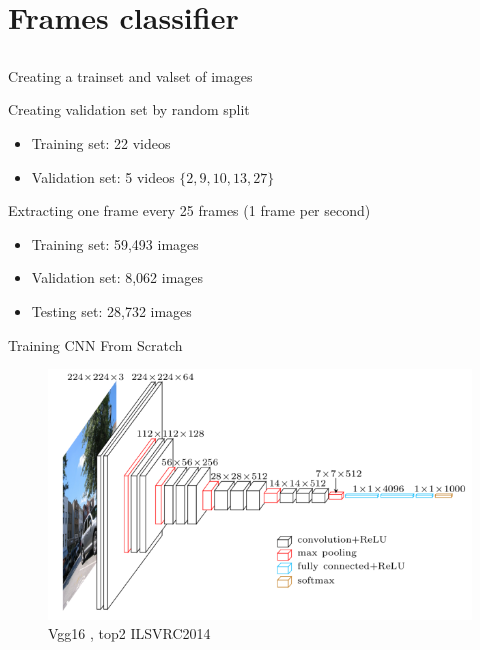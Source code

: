 \section{Frames classifier} \subsection{}\label{}

\begin{frame}{Creating a trainset and valset of images}

	\begin{block}{Creating validation set by random split}
	\begin{itemize}
		\item Training set: 22 videos
		\item Validation set: 5 videos $\{2,9,10,13,27\}$
	\end{itemize}
	\end{block}	
	
	\begin{block}{Extracting one frame every 25 frames (1 frame per second)}
	\begin{itemize}
		\item Training set: 59,493 images
		\item Validation set: 8,062 images
		\item Testing set: 28,732 images
	\end{itemize}
	\end{block}
	

\end{frame}

\begin{frame}{Training CNN From Scratch}

	\begin{figure}[h]
		\centering
		\includegraphics[width=.99\linewidth]{images/vgg16.png}
		\caption{\small Vgg16 \cite{simonyan2014very}, top2 ILSVRC2014}
		\label{fig:quora-invariance-1}
	\end{figure}
	
\end{frame}

